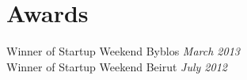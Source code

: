 \section{Awards} %
Winner of Startup Weekend Byblos \textit{March 2013}\\
Winner of Startup Weekend Beirut \textit{July 2012} 
\label{sec:section}
